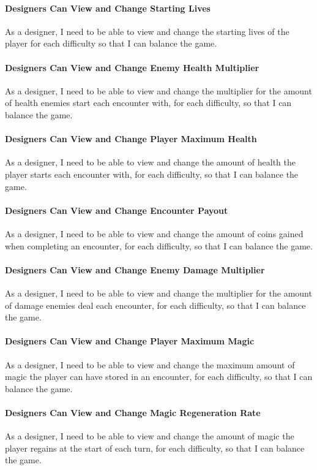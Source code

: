 \paragraph{Designers Can View and Change Starting Lives}
As a designer, I need to be able to view and change the starting lives of the player for each difficulty so that I can balance the game.

\paragraph{Designers Can View and Change Enemy Health Multiplier}
As a designer, I need to be able to view and change the multiplier for the amount of health enemies start each encounter with, for each difficulty, so that I can balance the game.

\paragraph{Designers Can View and Change Player Maximum Health}
As a designer, I need to be able to view and change the amount of health the player starts each encounter with, for each difficulty, so that I can balance the game.

\paragraph{Designers Can View and Change Encounter Payout}
As a designer, I need to be able to view and change the amount of coins gained when completing an encounter, for each difficulty, so that I can balance the game.

\paragraph{Designers Can View and Change Enemy Damage Multiplier}
As a designer, I need to be able to view and change the multiplier for the amount of damage enemies deal each encounter, for each difficulty, so that I can balance the game.

\paragraph{Designers Can View and Change Player Maximum Magic}
As a designer, I need to be able to view and change the maximum amount of magic the player can have stored in an encounter, for each difficulty, so that I can balance the game.

\paragraph{Designers Can View and Change Magic Regeneration Rate}
As a designer, I need to be able to view and change the amount of magic the player regains at the start of each turn, for each difficulty, so that I can balance the game.

